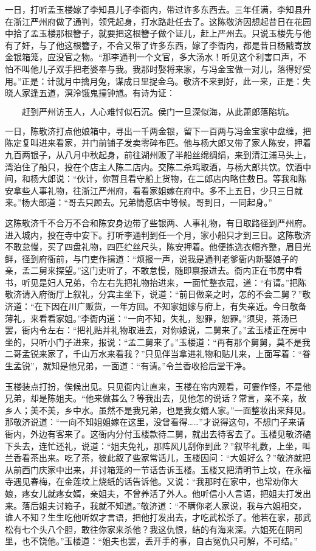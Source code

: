 一日，打听孟玉楼嫁了李知县儿子李衙内，带过许多东西去。三年任满，李知县升在浙江严州府做了通判，领凭起身，打水路赴任去了。这陈敬济因想起昔日在花园中拾了孟玉楼那根簪子，就要把这根簪子做个证儿，赶上严州去。只说玉楼先与他有了奸，与了他这根簪子，不合又带了许多东西，嫁了李衙内，都是昔日杨戬寄放金银箱笼，应没官之物。“那李通判一个文官，多大汤水！听见这个利害口声，不怕不叫他儿子双手把老婆奉与我。我那时娶将来家，与冯金宝做一对儿，落得好受用。”正是：计就月中擒月兔，谋成日里捉金乌。敬济不来到好，此一来，正是：失晓人家逢五道，溟泠饿鬼撞钟馗。有诗为证：

\[
赶到严州访玉人，人心难忖似石沉。
侯门一旦深似海，从此萧郎落陷坑。
\]

一日，陈敬济打点他娘箱中，寻出一千两金银，留下一百两与冯金宝家中盘缠，把陈定复叫进来看家，并门前铺子发卖零碎布匹。他与杨大郎又带了家人陈安，押着九百两银子，从八月中秋起身，前往湖州贩了半船丝绵绸绢，来到清江浦马头上，湾泊住了船只，投在个店主人陈二店内。交陈二杀鸡取酒，与杨大郎共饮。饮酒中间，和杨大郎说：“伙计，你暂且看守船上货物，在二郎店内略住数日。等我和陈安拿些人事礼物，往浙江严州府，看看家姐嫁在府中。多不上五日，少只三日就来。”杨大郎道：“哥去只顾去。兄弟情愿店中等候。哥到日，一同起身。”

这陈敬济千不合万不合和陈安身边带了些银两、人事礼物，有日取路径到严州府。进入城内，投在寺中安下。打听李通判到任一个月，家小船只才到三日。这陈敬济不敢怠慢，买了四盘礼物，四匹纻丝尺头，陈安押着。他便拣选衣帽齐整，眉目光鲜，径到府衙前，与门吏作揖道：“烦报一声，说我是通判老爹衙内新娶娘子的亲，孟二舅来探望。”这门吏听了，不敢怠慢，随即禀报进去。衙内正在书房中看书，听见是妇人兄弟，令左右先把礼物抬进来，一面忙整衣冠，道：“有请。”把陈敬济请入府衙厅上叙礼，分宾主坐下，说道：“前日做亲之时，怎的不会二舅？”敬济道：“在下因在川广贩货，一年方回。不知家姐嫁与府上，有失亲近。今日敬备薄礼，来看看家姐。”李衙内道：“一向不知，失礼，恕罪，恕罪。”须臾，茶汤已罢，衙内令左右：“把礼贴并礼物取进去，对你娘说，二舅来了。”孟玉楼正在房中坐的，只听小门子进来，报说：“孟二舅来了。”玉楼道：“再有那个舅舅，莫不是我二哥孟锐来家了，千山万水来看我？”只见伴当拿进礼物和贴儿来，上面写着：“眷生孟锐”，就知是他兄弟，一面道：“有请。”令兰香收拾后堂干净。

玉楼装点打扮，俟候出见。只见衙内让直来，玉楼在帘内观看，可霎作怪，不是他兄弟，却是陈姐夫。“他来做甚么？等我出去，见他怎的说话？常言，亲不亲，故乡人；美不美，乡中水。虽然不是我兄弟，也是我女婿人家。”一面整妆出来拜见。那敬济说道：“一向不知姐姐嫁在这里，没曾看得……”才说得这句，不想门子来请衙内，外边有客来了。这衙内分付玉楼款待二舅，就出去待客去了。玉楼见敬济磕下头去，连忙还礼，说道：“姐夫免礼，那阵风儿刮你到此？”叙毕礼数，上坐，叫兰香看茶出来。吃了茶，彼此叙了些家常话儿，玉楼因问：“大姐好么？”敬济就把从前西门庆家中出来，并讨箱笼的一节话告诉玉楼。玉楼又把清明节上坟，在永福寺遇见春梅，在金莲坟上烧纸的话告诉他。又说：“我那时在家中，也常劝你大娘，疼女儿就疼女婿，亲姐夫，不曾养活了外人。他听信小人言语，把姐夫打发出来。落后姐夫讨箱子，我就不知道。”敬济道：“不瞒你老人家说，我与六姐相交，谁人不知？生生吃他听奴才言语，把他打发出去，才吃武松杀了。他若在家，那武松有七个头八个胆，敢往你家来杀他？我这仇恨，结的有海来深。六姐死在阴司里，也不饶他。”玉楼道：“姐夫也罢，丢开手的事，自古冤仇只可解，不可结。”

